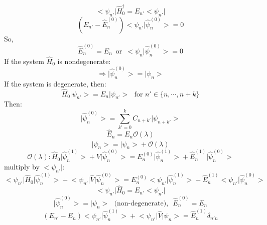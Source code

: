 \documentclass[12pt]{article}
\begin{document}
\begin{equation*}
  \big < \psi_{n'} \big|\hat{H}_0 ^\dag = E_{n'} \big < \psi_{n'} \big |
\end{equation*}
\begin{equation*}
	(E_{n'} - \hat{E}^{(0)}_n)\big < \psi_{n'} \big|\hat{\psi}^{(0)}_n \big > = 0
\end{equation*}
So,
\begin{equation}
  \hat{E}^{(0)}_n = E_n\,\,\,\text{or}\,\,\,\big < \psi_n \big| \hat{\psi}^{(0)}_n \big > = 0 
\end{equation}
\noindent
If the system $\hat{H}_0$ is nondegenerate: 
\[ \Longrightarrow \big|\hat{\psi}^{(0)}_n\big> = \big| \psi_n \big >\]
If the system is degenerate, then:
\begin{equation*}
	\hat{H}_0 \big|\psi_{n'} \big > = E_n \big| \psi_{n'} \big >\,\,\,\,\text{for } n' \in \{n, \cdots, n+k\}
\end{equation*}
Then:
\begin{equation*}
	\big | \hat{\psi}^{(0)}_n \big > = \sum_{k'=0}^{k} C_{n+k'} \big|\psi_{n+k'} \big >
\end{equation*}
\begin{equation*}
	\hat{E}_n = E_n \mathcal{O}(\lambda)
\end{equation*}
\begin{equation*}
	\big | \hat{\psi}_n \big > = | \psi_n\big > + \mathcal{O}(\lambda)
\end{equation*}
\begin{equation*}
\mathcal{O}(\lambda): \hat{H}_0 \big|\hat{\psi}^{(1)}_n \big> + \hat{V} \big|\hat{\psi}^{(0)}_n \big>
= E_n^{(0)} \big|\hat{\psi}^{(1)}_n \big> + \hat{E}^{(1)}_n  \big|\hat{\psi}^{(0)}_n \big> 
\end{equation*}
multiply by $\big<\psi_{n'} \big|$:
\begin{equation*}
\big<\psi_{n'} \big|\hat{H}_0 \big|\hat{\psi}^{(1)}_n \big> + \big<\psi_{n'} \big|\hat{V} \big|\hat{\psi}^{(0)}_n \big>
= E_n^{(0)}\big<\psi_{n'}\big|\hat{\psi}^{(1)}_n \big> + \hat{E}^{(1)}_n \big<\psi_{n'} \big|\hat{\psi}^{(0)}_n \big> 
\end{equation*}
\begin{equation*}
	\big<\psi_{n'} \big|\hat{H}_0 = E_{n'} \big<\psi_{n'} \big|
\end{equation*}
$$
\big|\hat{\psi}^{(0)}_n \big> = \big|\psi_n \big>\,\,\,\,\text{(non-degenerate)},\,\,\,\hat{E}^{(0)}_n = E_n
$$
\begin{equation}
	(E_{n'}-E_n)\big< \psi_{n'} \big|\hat{\psi}^{(1)}_n \big> + \big < \psi_{n'} \big| \hat{V}\big|\psi_n \big>
	= \hat{E}^{(1)}_n \delta_{n'n}
\end{equation}
\end{document}
